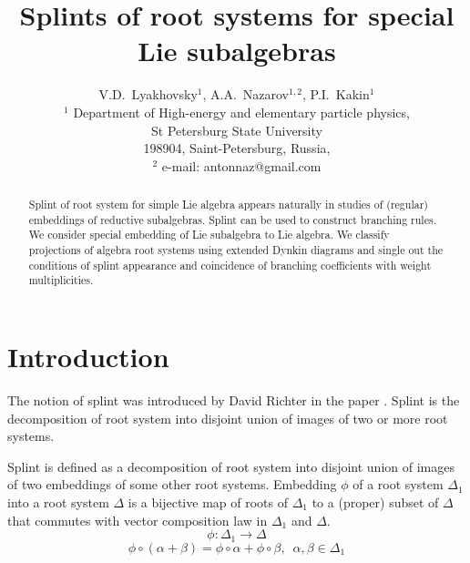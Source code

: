 \documentclass{article}
\begin{document}
\title{Splints of root systems for special Lie subalgebras} %



\author{V.D.~Lyakhovsky$^1$, A.A.~Nazarov$^{1,2}$, P.I.~Kakin$^{1}$\\
  {\small $^1$ Department of High-energy and elementary particle physics,}\\ {\small St Petersburg State University}\\
  {\small 198904, Saint-Petersburg, Russia,}\\
  {\small $^{2}$ e-mail: antonnaz@gmail.com}}
\date{}
\maketitle

\begin{abstract}
  Splint of root system for simple Lie algebra appears naturally in studies of (regular) embeddings
  of reductive subalgebras. Splint can be used to construct branching rules. We consider special
  embedding of Lie subalgebra to Lie algebra. We classify projections of algebra root systems using
  extended Dynkin diagrams and single out the conditions of splint appearance and coincidence of
  branching coefficients with weight multiplicities.
\end{abstract}

\section{Introduction}
\label{sec:introduction}

The notion of splint was introduced by David Richter in the paper \cite{richter2008splints}. Splint
is the decomposition of root system into disjoint union of images of two or more root systems.

Splint is defined as a decomposition of root system into disjoint union of images of two embeddings
of some other root systems. Embedding $\phi$ of a root system $\Delta_1$ into a root system $\Delta$
is a bijective map of roots of $\Delta_{1}$ to a (proper) subset of $\Delta$ that commutes with
vector composition law in $\Delta_{1}$ and $\Delta$.
\begin{equation*}
\phi:\Delta_1 \longrightarrow \Delta
\end{equation*}
\begin{equation*}
\phi \circ (\alpha + \beta) =\phi \circ \alpha + \phi \circ \beta,
\,\,\, \alpha,\beta \in \Delta_1
\end{equation*}
\end{document}
